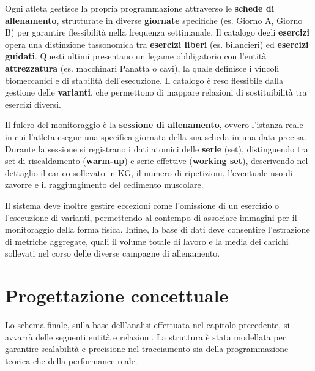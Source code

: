 \documentclass[12pt]{report}
\begin{document}
Ogni atleta gestisce la propria programmazione attraverso le \textbf{schede di allenamento}, strutturate in diverse \textbf{giornate} specifiche (es. Giorno A, Giorno B) per garantire flessibilità nella frequenza settimanale. Il catalogo degli \textbf{esercizi} opera una distinzione tassonomica tra \textbf{esercizi liberi} (es. bilancieri) ed \textbf{esercizi guidati}. Questi ultimi presentano un legame obbligatorio con l'entità \textbf{attrezzatura} (es. macchinari Panatta o cavi), la quale definisce i vincoli biomeccanici e di stabilità dell'esecuzione. Il catalogo è reso flessibile dalla gestione delle \textbf{varianti}, che permettono di mappare relazioni di sostituibilità tra esercizi diversi.

Il fulcro del monitoraggio è la \textbf{sessione di allenamento}, ovvero l'istanza reale in cui l'atleta esegue una specifica giornata della sua scheda in una data precisa. Durante la sessione si registrano i dati atomici delle \textbf{serie} (set), distinguendo tra set di riscaldamento (\textbf{warm-up}) e serie effettive (\textbf{working set}), descrivendo nel dettaglio il carico sollevato in KG, il numero di ripetizioni, l'eventuale uso di zavorre e il raggiungimento del cedimento muscolare.

Il sistema deve inoltre gestire eccezioni come l'omissione di un esercizio o l'esecuzione di varianti, permettendo al contempo di associare immagini per il monitoraggio della forma fisica. Infine, la base di dati deve consentire l'estrazione di metriche aggregate, quali il volume totale di lavoro e la media dei carichi sollevati nel corso delle diverse campagne di allenamento.

\chapter{Progettazione concettuale}

Lo schema finale, sulla base dell'analisi effettuata nel capitolo precedente, si avvarrà delle seguenti entità e relazioni. La struttura è stata modellata per garantire scalabilità e precisione nel tracciamento sia della programmazione teorica che della performance reale.

\renewcommand{\arraystretch}{1.5} 
\small 
\end{document}
